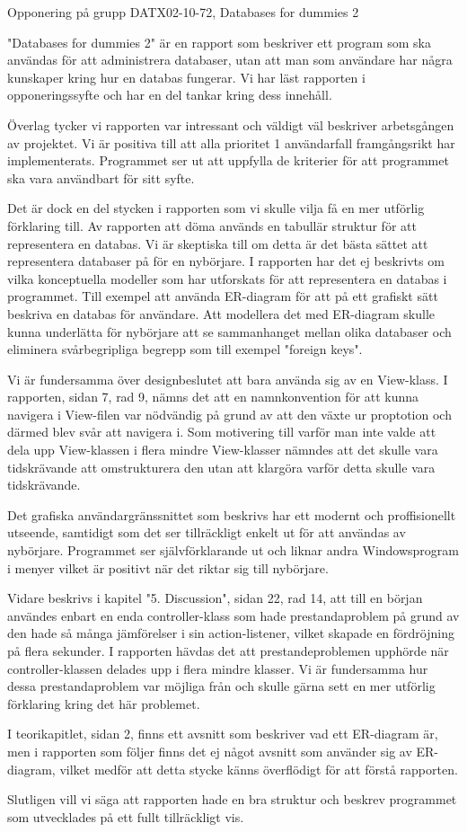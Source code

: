 Opponering på grupp DATX02-10-72, Databases for dummies 2

"Databases for dummies 2" är en rapport som beskriver ett program som ska användas för att administrera databaser, utan att man som användare har några kunskaper kring hur en databas fungerar. Vi har läst rapporten i opponeringssyfte och har en del tankar kring dess innehåll.

Överlag tycker vi rapporten var intressant och väldigt väl beskriver arbetsgången av projektet. Vi är positiva till att alla prioritet 1 användarfall framgångsrikt har implementerats. Programmet ser ut att uppfylla de kriterier för att programmet ska vara användbart för sitt syfte. 

Det är dock en del stycken i rapporten som vi skulle vilja få en mer utförlig förklaring till.
Av rapporten att döma används en tabullär struktur för att representera en databas. Vi är skeptiska till om detta är det bästa sättet att representera databaser på för en nybörjare. I rapporten har det ej beskrivts om vilka konceptuella modeller som har utforskats för att representera en databas i programmet. Till exempel att använda ER-diagram för att på ett grafiskt sätt beskriva en databas för användare. Att modellera det med ER-diagram skulle kunna underlätta för nybörjare att se sammanhanget mellan olika databaser och eliminera svårbegripliga begrepp som till exempel "foreign keys".

Vi är fundersamma över designbeslutet att bara använda sig av en View-klass. I rapporten, sidan 7, rad 9,  nämns det att en namnkonvention för att kunna navigera i View-filen var nödvändig på grund av att den växte ur proptotion och därmed blev svår att navigera i. Som motivering till varför man inte valde att dela upp View-klassen i flera mindre View-klasser nämndes att det skulle vara tidskrävande att omstrukturera den utan att klargöra varför detta skulle vara tidskrävande.  

Det grafiska användargränssnittet som beskrivs har ett modernt och proffisionellt utseende, samtidigt som det ser tillräckligt enkelt ut för att användas av nybörjare. Programmet ser självförklarande ut och liknar andra Windowsprogram i menyer vilket är positivt när det riktar sig till nybörjare. 

Vidare beskrivs i kapitel "5. Discussion", sidan 22, rad 14, att till en början användes enbart en enda controller-klass som hade prestandaproblem på grund av den hade så många jämförelser i sin action-listener, vilket skapade en fördröjning på flera sekunder. I rapporten hävdas det att prestandeproblemen upphörde när controller-klassen delades upp i flera mindre klasser. Vi är fundersamma hur dessa prestandaproblem var möjliga från och skulle gärna sett en mer utförlig förklaring kring det här problemet. 

I teorikapitlet, sidan 2, finns ett avsnitt som beskriver vad ett ER-diagram är, men i rapporten som följer finns det ej något avsnitt som använder sig av ER-diagram, vilket medför att detta stycke känns överflödigt för att förstå rapporten.

Slutligen vill vi säga att rapporten hade en bra struktur och beskrev programmet som utvecklades på ett fullt tillräckligt vis.
